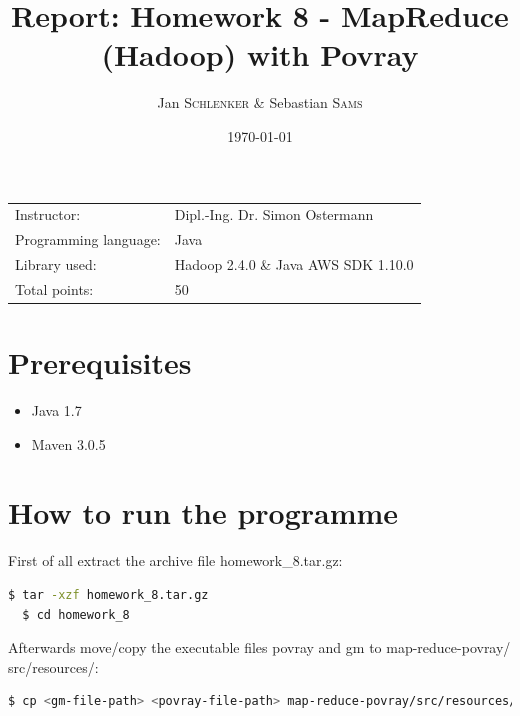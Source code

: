 \documentclass{article}
\title{Report: Homework 8 - MapReduce (Hadoop) with Povray}%
\author{Jan \textsc{Schlenker} \& Sebastian \textsc{Sams}} %
\date{\today} %
\begin{document}
\maketitle %

\begin{center}
\begin{tabular}{l l}
Instructor: & Dipl.-Ing. Dr. Simon Ostermann \\
Programming language: & Java \\
Library used: & Hadoop 2.4.0 \& Java AWS SDK 1.10.0 \\
Total points: & 50 \\
\end{tabular}
\end{center}



\section{Prerequisites}

\begin{itemize}
\item Java 1.7
\item Maven 3.0.5
\end{itemize}

\section{How to run the programme}

First of all extract the archive file homework\_8.tar.gz:

\begin{lstlisting}[language=bash, deletekeywords={cd}]
  $ tar -xzf homework_8.tar.gz
  $ cd homework_8
\end{lstlisting}

Afterwards move/copy the executable files povray and gm to map-reduce-povray/ src/resources/:

\begin{lstlisting}[language=bash]
  $ cp <gm-file-path> <povray-file-path> map-reduce-povray/src/resources/
\end{lstlisting}
\end{document}
